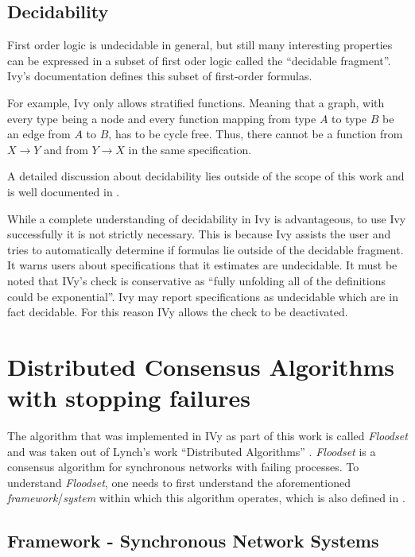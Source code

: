 \documentclass[fleqn]{article}
\begin{document}
\subsection{Decidability}
First order logic is undecidable in general, but still many interesting properties can be expressed in a subset of first oder logic called the ``decidable fragment''. Ivy's documentation defines this subset of first-order formulas. \cite{decid}

For example, Ivy only allows stratified functions. Meaning that a graph, with every type being a node and every function mapping from type $A$ to type $B$ be an edge from $A$ to $B$, has to be cycle free. Thus, there cannot be a function from $X \rightarrow Y$ and from $Y \rightarrow X$ in the same specification.

A detailed discussion about decidability lies outside of the scope of this work and is well documented in \cite{decide}.

While a complete understanding of decidability in Ivy is advantageous, to use Ivy successfully it is not strictly necessary. This is because Ivy assists the user and tries to automatically determine if formulas lie outside of the decidable fragment. It warns users about specifications that it estimates are undecidable.  It must be noted that IVy's check is conservative as ``fully unfolding all of the definitions could be exponential''. Ivy may report specifications as undecidable which are in fact decidable. For this reason IVy allows the check to be deactivated. \cite{decid}


\section{Distributed Consensus Algorithms with stopping failures}

The algorithm that was implemented in IVy as part of this work is called \textit{Floodset} and was taken out of Lynch's work ``Distributed Algorithms'' \cite{refNancy}.
\textit{Floodset} is a consensus algorithm for synchronous networks with failing processes.
To understand \textit{Floodset}, one needs to first understand the aforementioned \textit{framework}/\textit{system} within which this algorithm operates, which is also defined in \cite{refNancy}.

\subsection{Framework - Synchronous Network Systems}
\end{document}
